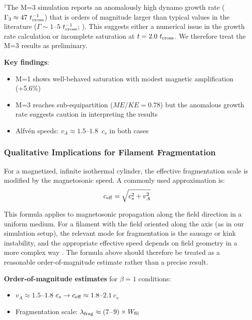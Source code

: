 \documentclass[11pt,a4paper]{article}
\begin{document}
$^{\dagger}$The M=3 simulation reports an anomalously high dynamo growth rate ($\Gamma_3 \approx 47~t_{\rm cross}^{-1}$) that is orders of magnitude larger than typical values in the literature ($\Gamma \sim 1$--$5~t_{\rm cross}^{-1}$; \citealt{Federrath2011, Schober2012}). This suggests either a numerical issue in the growth rate calculation or incomplete saturation at $t = 2.0~t_{\rm cross}$. We therefore treat the M=3 results as preliminary.

\textbf{Key findings}:
\begin{itemize}
    \item M=1 shows well-behaved saturation with modest magnetic amplification (+5.6\%)
    \item M=3 reaches sub-equipartition ($ME/KE = 0.78$) but the anomalous growth rate suggests caution in interpreting the results
    \item Alfv\'en speeds: $v_A \approx 1.5$--$1.8$~$c_s$ in both cases
\end{itemize}

\subsubsection{Qualitative Implications for Filament Fragmentation}

For a magnetized, infinite isothermal cylinder, the effective fragmentation scale is modified by the magnetosonic speed. A commonly used approximation \citep{Nakamura2008, Hanawa2017} is:
\begin{equation}
c_{\rm eff} = \sqrt{c_s^2 + v_A^2}
\end{equation}

This formula applies to magnetosonic propagation along the field direction in a uniform medium. For a filament with the field oriented along the axis (as in our simulation setup), the relevant mode for fragmentation is the sausage or kink instability, and the appropriate effective speed depends on field geometry in a more complex way \citep{Hanawa2017}. The formula above should therefore be treated as a reasonable order-of-magnitude estimate rather than a precise result.

\textbf{Order-of-magnitude estimates} for $\beta = 1$ conditions:
\begin{itemize}
    \item $v_A \approx 1.5$--$1.8~c_s \rightarrow c_{\rm eff} \approx 1.8$--$2.1~c_s$
    \item Fragmentation scale: $\lambda_{\rm frag} \approx (7$--$9) \times W_{\rm fil}$
\end{itemize}
\end{document}
